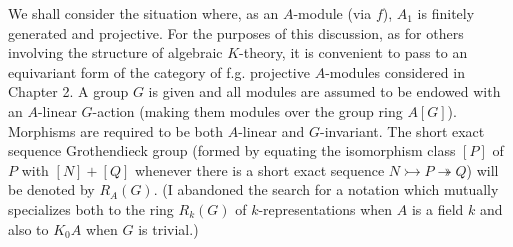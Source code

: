 \documentclass[openany,leqno]{book}  %
\begin{document}
We shall consider the situation where, as an $A$-module (via $f$), $A_1$ is finitely generated and projective.
For the purposes of this discussion, as for others involving the structure of algebraic
$K$-theory, it is convenient to pass to an equivariant form of the category of f.g. projective $A$-modules considered in Chapter 2. A group $G$ is given and all modules are assumed to be
endowed with an $A$-linear $G$-action (making them modules over the group ring $A[G]$). Morphisms are required to be both $A$-linear and $G$-invariant. The short exact sequence Grothendieck group (formed by equating the isomorphism class $[P]$ of $P$ with $[N] + [Q]$ whenever there is a short exact sequence $N \rightarrowtail P \twoheadrightarrow Q$) will be denoted by $R_A(G)$. (I abandoned the search for a notation which mutually specializes both to the ring $R_k(G)$ of $k$-representations when $A$ is a field $k$ and also to $K_0A$ when $G$ is trivial.)
\end{document}
